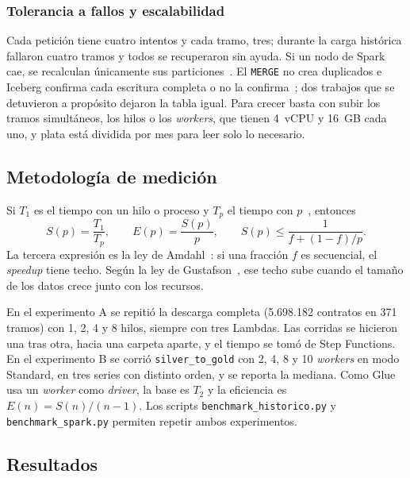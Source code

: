 \subsubsection{Tolerancia a fallos y escalabilidad}
Cada petición tiene cuatro intentos y cada tramo, tres; durante la carga histórica fallaron cuatro tramos y todos se recuperaron sin ayuda. Si un nodo de Spark cae, se recalculan únicamente sus particiones~\cite{zaharia2012}. El \texttt{MERGE} no crea duplicados e Iceberg confirma cada escritura completa o no la confirma~\cite{asf_iceberg_spec}; dos trabajos que se detuvieron a propósito dejaron la tabla igual. Para crecer basta con subir los tramos simultáneos, los hilos o los \textit{workers}, que tienen 4~vCPU y 16~GB cada uno, y plata está dividida por mes para leer solo lo necesario.

\subsection{Metodología de medición}
Si $T_1$ es el tiempo con un hilo o proceso y $T_p$ el tiempo con $p$~\cite{grama2003}, entonces
\begin{equation}
S(p) = \frac{T_1}{T_p}, \qquad E(p) = \frac{S(p)}{p}, \qquad S(p) \leq \frac{1}{f + (1-f)/p}.
\end{equation}
La tercera expresión es la ley de Amdahl~\cite{amdahl1967}: si una fracción $f$ es secuencial, el \textit{speedup} tiene techo. Según la ley de Gustafson~\cite{gustafson1988}, ese techo sube cuando el tamaño de los datos crece junto con los recursos.

En el experimento A se repitió la descarga completa (5.698.182 contratos en 371 tramos) con 1, 2, 4 y 8 hilos, siempre con tres Lambdas. Las corridas se hicieron una tras otra, hacia una carpeta aparte, y el tiempo se tomó de Step Functions. En el experimento B se corrió \texttt{silver\_to\_gold} con 2, 4, 8 y 10 \textit{workers} en modo Standard, en tres series con distinto orden, y se reporta la mediana. Como Glue usa un \textit{worker} como \textit{driver}, la base es $T_2$ y la eficiencia es $E(n) = S(n)/(n-1)$. Los scripts \texttt{benchmark\_historico.py} y \texttt{benchmark\_spark.py} permiten repetir ambos experimentos.

\subsection{Resultados}

